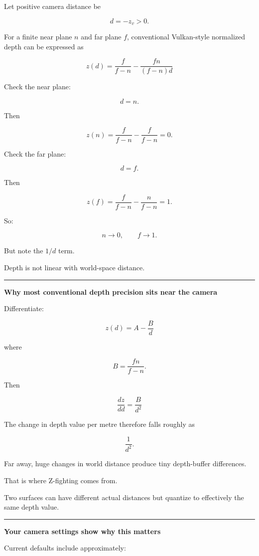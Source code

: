 Let positive camera distance be

\[
d=-z_v>0.
\]

For a finite near plane \(n\) and far plane \(f\), conventional Vulkan-style normalized depth can be expressed as

\[
\boxed{
z(d)
=
\frac{f}{f-n}
-
\frac{fn}{(f-n)d}
}
\]

Check the near plane:

\[
d=n.
\]

Then

\[
z(n)=
\frac{f}{f-n}
-
\frac{f}{f-n}
=0.
\]

Check the far plane:

\[
d=f.
\]

Then

\[
z(f)=
\frac{f}{f-n}
-
\frac{n}{f-n}
=1.
\]

So:

\[
n\rightarrow0,
\qquad
f\rightarrow1.
\]

But note the \(1/d\) term.

Depth is not linear with world-space distance.

\begin{center}\rule{0.5\linewidth}{0.5pt}\end{center}

\textbf{Why most conventional depth precision sits near the camera}

Differentiate:

\[
z(d)=A-\frac{B}{d}
\]

where

\[
B=\frac{fn}{f-n}.
\]

Then

\[
\boxed{
\frac{dz}{dd}
=
\frac{B}{d^2}
}
\]

The change in depth value per metre therefore falls roughly as

\[
\frac1{d^2}.
\]

Far away, huge changes in world distance produce tiny depth-buffer differences.

That is where Z-fighting comes from.

Two surfaces can have different actual distances but quantize to effectively the same depth value.

\begin{center}\rule{0.5\linewidth}{0.5pt}\end{center}

\textbf{Your camera settings show why this matters}

Current  defaults include approximately:

